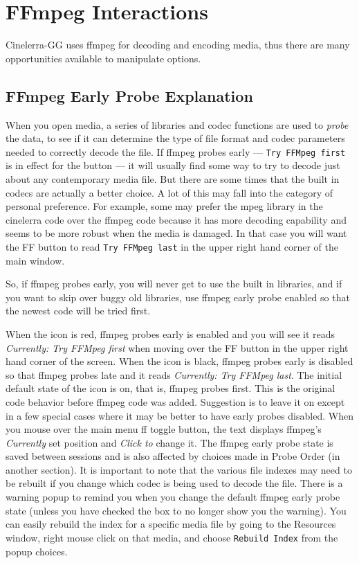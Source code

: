 \chapter{FFmpeg Interactions}%
\label{cha:ffmpeg_interactions}

Cinelerra-GG uses ffmpeg for decoding and encoding media, thus there are many opportunities available to manipulate options.

\section{FFmpeg Early Probe Explanation}%
\label{sec:ffmpeg_early_probe_explanation}

When you open media, a series of libraries and codec functions are used to \textit{probe} the data, to see if it can determine the type of file format and codec parameters needed to correctly decode the file.  If ffmpeg probes early --- \texttt{Try FFMpeg first} is in effect for the button --- it will usually find some way to try to decode just about any contemporary media file.  But there are some times that the built in codecs are actually a better choice.  A lot of this may fall into the category of personal preference.  For example, some may prefer the mpeg library in the cinelerra code over the ffmpeg code because it has more decoding capability and seems to be more robust when the media is damaged.  In that case you will want the FF button to read \texttt{Try FFMpeg last} in the upper right hand corner of the main window.

So, if ffmpeg probes early, you will never get to use the built in libraries, and if you want to skip over buggy old libraries, use ffmpeg early probe enabled so that the newest code will be tried first.

When the icon is red, ffmpeg probes early is enabled and you will see it reads \textit{Currently: Try FFMpeg first} when moving over the FF button in the upper right hand corner of the screen.  When the icon is black, ffmpeg probes early is disabled so that ffmpeg probes late and it reads \textit{Currently: Try FFMpeg last}.  The initial default state of the icon is on, that is, ffmpeg probes first.  This is the original code behavior before ffmpeg code was added.  Suggestion is to leave it on except in a few special cases where it may be better to have early probes disabled.  When you mouse over the main menu ff toggle button, the text displays ffmpeg's \textit{Currently} set position and \textit{Click to} change it.
The ffmpeg early probe state is saved between sessions and is also affected by choices made in Probe Order (in another section). It is important to note that the various file indexes may need to be rebuilt if you change which codec is being used to decode the file.  There is a warning popup to remind you when you change the default ffmpeg early probe state (unless you have checked the box to no longer show you the warning).  You can easily rebuild the index for a specific media file by going to the Resources window, right mouse click on that media, and choose \texttt{Rebuild Index} from the popup choices.

